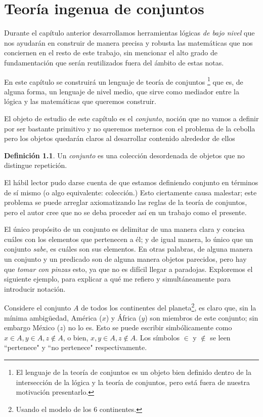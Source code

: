 \documentclass{book}
\theoremstyle{definition}
\newtheorem{df}{Definición}[chapter]
\begin{document}
\chapter{Teoría ingenua de conjuntos}
Durante el capítulo anterior desarrollamos herramientas lógicas \emph{de bajo nivel} que nos ayudarán en construir de manera precisa y robusta las matemáticas que nos conciernen en el resto de este trabajo, sin mencionar el alto grado de fundamentación que serán reutilizados fuera del ámbito de estas notas.

En este capítulo se construirá un lenguaje de teoría de conjuntos
\footnote{El lenguaje de la teoría de conjuntos es un objeto bien definido dentro de la intersección de la lógica y la teoría de conjuntos, pero está fuera de nuestra motivación presentarlo. %
}
que es, de alguna forma, un lenguaje de nivel medio, que sirve como mediador entre la lógica y las matemáticas que queremos construir.

El objeto de estudio de este capítulo es el \emph{conjunto}, noción que no vamos a definir por ser bastante primitivo y no queremos meternos con el problema de la cebolla %
pero los objetos quedarán claros al desarrollar contenido alrededor de ellos

\begin{df} %
	Un \emph{conjunto} es una colección desordenada de objetos que no distingue repetición.
\end{df}

El hábil lector pudo darse cuenta de que estamos definiendo conjunto en términos de sí mismo (o algo equivalente: colección.) Esto ciertamente causa malestar; este problema se puede arreglar axiomatizando las reglas de la teoría de conjuntos, pero el autor cree que no se deba proceder así en un trabajo como el presente.   %

El único propósito de un conjunto es delimitar de una manera clara y concisa cuáles con los elementos que pertenecen a él; y de igual manera, lo único que un conjunto \emph{sabe}, es cuáles son sus elementos.
En otras palabras, de alguna manera un conjunto y un predicado son de alguna manera objetos parecidos, pero hay que \emph{tomar con pinzas} esto, ya que no es difícil llegar a paradojas.
Exploremos el siguiente ejemplo, para explicar a qué me refiero y simultáneamente para introducir notación.

Considere el conjunto $A$ de todos los continentes del planeta\footnote{Usando el modelo de los 6 continentes.}, es claro que, sin la mínima ambigüedad, América ($x$) y África ($y$) son miembros de este conjunto; sin embargo México ($z$) no lo es.
Esto se puede escribir simbólicamente como $x \in A, y\in A, z \notin A$, o bien, $x,y\in A, z\notin A$. 
Los símbolos $\in$ y $\notin$ se leen ``pertenece" y ``no pertenece" respectivamente.
\end{document}
